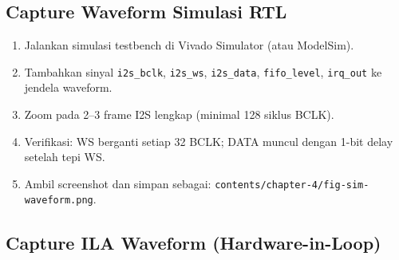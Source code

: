 \subsection{Capture Waveform Simulasi RTL}

\begin{enumerate}
  \item Jalankan simulasi testbench di Vivado Simulator (atau ModelSim).
  \item Tambahkan sinyal \texttt{i2s\_bclk}, \texttt{i2s\_ws}, \texttt{i2s\_data}, \texttt{fifo\_level}, \texttt{irq\_out}
        ke jendela waveform.
  \item Zoom pada 2--3 frame I2S lengkap (minimal 128 siklus BCLK).
  \item Verifikasi: WS berganti setiap 32 BCLK; DATA muncul dengan 1-bit delay setelah tepi WS.
  \item Ambil screenshot dan simpan sebagai: \texttt{contents/chapter-4/fig-sim-waveform.png}.
\end{enumerate}

\subsection{Capture ILA Waveform (Hardware-in-Loop)}

